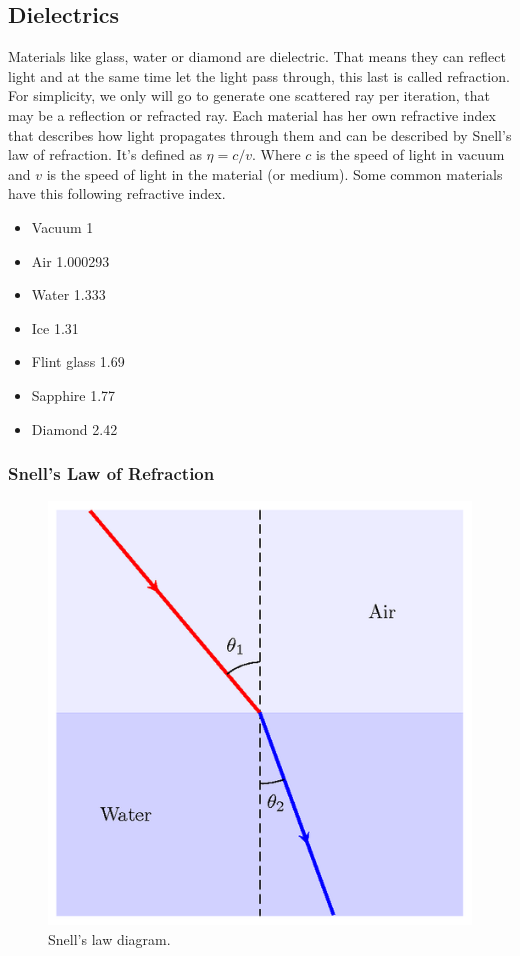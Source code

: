 \documentclass[titlepage,12pt]{report}
\begin{document}
\subsection{Dielectrics}

Materials like glass, water or diamond are dielectric. That means they can reflect light and at the same time let the light pass through, this last is called refraction. For simplicity, we only will go to generate one scattered ray per iteration, that may be a reflection or refracted ray. Each material has her own refractive index that describes how light propagates through them and can be described by Snell's law of refraction. It's defined as $\eta = c/v$. Where $c$ is the speed of light in vacuum and $v$ is the speed of light in the material (or medium). Some common materials have this following refractive index.

\begin{itemize}

	\item Vacuum 1
	\item Air 1.000293
	\item Water 1.333
	\item Ice 1.31
	\item Flint glass 1.69
	\item Sapphire 1.77
	\item Diamond 2.42

\end{itemize}

\subsubsection{Snell's Law of Refraction}

\begin{figure}[H]
	\centering
	\includegraphics[scale=0.45]{media/refraction.png}
	\caption{Snell's law diagram.}
	\label{snell}
\end{figure}
\end{document}
